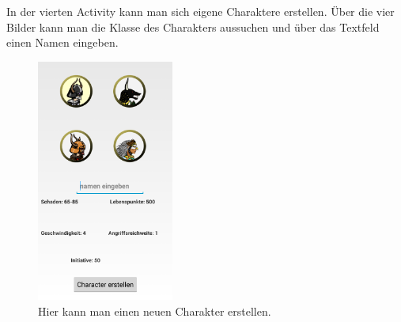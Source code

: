 \documentclass[extern,palatino]{cgBA}
\begin{document}
In der vierten Activity kann man sich eigene Charaktere erstellen. Über die vier Bilder kann man die Klasse des Charakters aussuchen und über das Textfeld einen Namen eingeben.
\newpage
\begin{figure}[htb] 
	\centering
	\includegraphics[width=0.4\textwidth]{createcharscreen.png}
	\caption{Hier kann man einen neuen Charakter erstellen.}
	\label{fig:Bild5}
\end{figure} 
\end{document}
